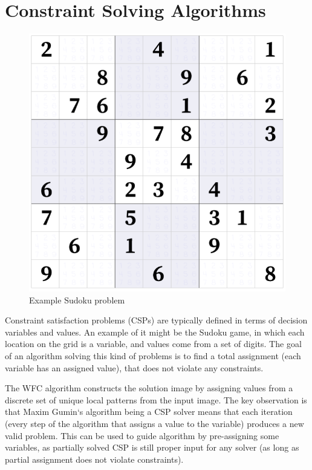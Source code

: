 \documentclass[shortabstract, english, inz]{iithesis}
\begin{document}
\section{Constraint Solving Algorithms}
\begin{figure}[H]
\centering
\includegraphics[width=1\textwidth, angle=0]{images/sudoku.png}
\caption{Example Sudoku problem \cite{sudoku}}
\label{fig:sudoku}
\end{figure}
Constraint satisfaction problems (CSPs) are typically defined in terms of decision variables and values. An example of it might be the Sudoku game, in which each location on the grid is a variable, and values come from a set of digits. The goal of an algorithm solving this kind of problems is to find a total assignment (each variable has an assigned value), that does not violate any constraints.

The WFC algorithm constructs the solution image by assigning values from a discrete set of unique local patterns from the input image. \cite{Smith} The key observation is that Maxim Gumin`s algorithm being a CSP solver means that each iteration (every step of the algorithm that assigns a value to the variable) produces a new valid problem. This can be used to guide algorithm by pre-assigning some variables, as partially solved CSP is still proper input for any solver (as long as partial assignment does not violate constraints).
\end{document}
